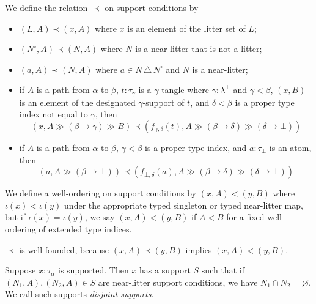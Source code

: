 \documentclass{article}
\begin{document}
\begin{definition}
    We define the relation \( \prec \) on support conditions by
    \begin{itemize}
        \item \( (L, A) \prec (x, A) \) where \( x \) is an element of the litter set of \( L \);
        \item \( (N^\circ, A) \prec (N, A) \) where \( N \) is a near-litter that is not a litter;
        \item \( (a, A) \prec (N, A) \) where \( a \in N\,\triangle\,N^\circ \) and \( N \) is a near-litter;
        \item
            if \( A \) is a path from \( \alpha \) to \( \beta \),
            \( t : \tau_\gamma \) is a \( \gamma \)-tangle where \( \gamma : \lambda^\bot \) and \( \gamma < \beta \),
            \( (x, B) \) is an element of the designated \( \gamma \)-support of \( t \),
            and \( \delta < \beta \) is a proper type index not equal to \( \gamma \),
            then
            \[ (x, A \gg (\beta \longrightarrow \gamma) \gg B) \prec (f_{\gamma,\delta}(t), A \gg (\beta \longrightarrow \delta) \gg (\delta \longrightarrow \bot)) \]
        \item if \( A \) is a path from \( \alpha \) to \( \beta \), \( \gamma < \beta \) is a proper type index, and \( a : \tau_\bot \) is an atom, then
        \[ (a, A \gg (\beta \longrightarrow \bot)) \prec (f_{\bot,\delta}(a), A \gg (\beta \longrightarrow \delta) \gg (\delta \longrightarrow \bot)) \]
    \end{itemize}
\end{definition}
\begin{definition}
    We define a well-ordering on support conditions by \( (x, A) < (y, B) \) where \( \iota(x) < \iota(y) \) under the appropriate typed singleton or typed near-litter map, but if \( \iota(x) = \iota(y) \), we say \( (x, A) < (y, B) \) if \( A < B \) for a fixed well-ordering of extended type indices.
\end{definition}
\begin{lemma}
    \( \prec \) is well-founded, because \( (x, A) \prec (y, B) \) implies \( (x, A) < (y, B) \).
\end{lemma}
\begin{lemma}
    Suppose \( x : \tau_\alpha \) is supported.
    Then \( x \) has a support \( S \) such that if \( (N_1, A), (N_2, A) \in S \) are near-litter support conditions, we have \( N_1 \cap N_2 = \varnothing \).
    We call such supports \emph{disjoint supports}.
\end{lemma}
\end{document}
